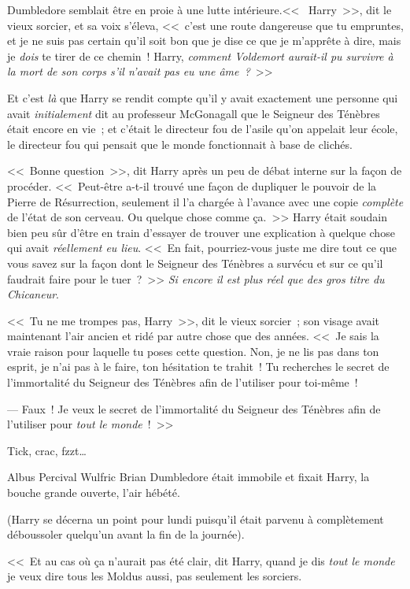 Dumbledore semblait être en proie à une lutte intérieure.<<~ Harry~>>, dit le vieux sorcier, et sa voix s'éleva, <<~c'est une route dangereuse que tu empruntes, et je ne suis pas certain qu'il soit bon que je dise ce que je m'apprête à dire, mais je \emph{dois} te tirer de ce chemin~! Harry, \emph{comment Voldemort aurait-il pu survivre à la mort de son corps s'il n'avait pas eu une âme~?}~>>

Et c'est \emph{là} que Harry se rendit compte qu'il y avait exactement une personne qui avait \emph{initialement} dit au professeur McGonagall que le Seigneur des Ténèbres était encore en vie~; et c'était le directeur fou de l'asile qu'on appelait leur école, le directeur fou qui pensait que le monde fonctionnait à base de clichés.

<<~Bonne question~>>, dit Harry après un peu de débat interne sur la façon de procéder. <<~Peut-être a-t-il trouvé une façon de dupliquer le pouvoir de la Pierre de Résurrection, seulement il l'a chargée à l'avance avec une copie \emph{complète} de l'état de son cerveau. Ou quelque chose comme ça.~>> Harry était soudain bien peu sûr d'être en train d'essayer de trouver une explication à quelque chose qui avait \emph{réellement eu lieu}. <<~En fait, pourriez-vous juste me dire tout ce que vous savez sur la façon dont le Seigneur des Ténèbres a survécu et sur ce qu'il faudrait faire pour le tuer~?~>> \emph{Si encore il est plus réel que des gros titre du Chicaneur}.

<<~Tu ne me trompes pas, Harry~>>, dit le vieux sorcier~; son visage avait maintenant l'air ancien et ridé par autre chose que des années. <<~Je sais la vraie raison pour laquelle tu poses cette question. Non, je ne lis pas dans ton esprit, je n'ai pas à le faire, ton hésitation te trahit~! Tu recherches le secret de l'immortalité du Seigneur des Ténèbres afin de l'utiliser pour toi-même~!

--- Faux~! Je veux le secret de l'immortalité du Seigneur des Ténèbres afin de l'utiliser pour \emph{tout le monde}~!~>>

\later

Tick, crac, fzzt…

Albus Percival Wulfric Brian Dumbledore était immobile et fixait Harry, la bouche grande ouverte, l'air hébété.

(Harry se décerna un point pour lundi puisqu'il était parvenu à complètement déboussoler quelqu'un avant la fin de la journée).

<<~Et au cas où ça n'aurait pas été clair, dit Harry, quand je dis \emph{tout le monde} je veux dire tous les Moldus aussi, pas seulement les sorciers.

